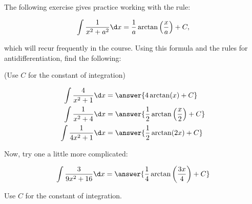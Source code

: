 \documentclass{ximera}
\author{Jim Talamo}
\begin{document}
\begin{exercise}
The following exercise gives practice working with the rule: 

\[\int \frac{1}{x^2+a^2} \d x = \frac{1}{a} \arctan\left(\frac{x}{a}\right) +C, \]

which will recur frequently in the course.  Using this formula and the rules for antidifferentiation, find the following:

\begin{prompt} (Use $C$ for the constant of integration) \end{prompt}

\begin{align*}
\int \frac{4}{x^2+1} \d x &= \answer{4\arctan(x)+C}\\
\int \frac{1}{x^2+4} \d x &= \answer{\frac{1}{2}\arctan\left(\frac{x}{2}\right)+C}\\
\int \frac{1}{4x^2+1} \d x &= \answer{\frac{1}{2} \arctan(2x)+C}\\
\end{align*}

Now, try one a little more complicated:

\[ \int \frac{3}{9x^2+16} \d x = \answer{\frac{1}{4}\arctan\left(\frac{3x}{4}\right)+C} \]

\begin{prompt} Use $C$ for the constant of integration. \end{prompt}
\end{exercise}
\end{document}
